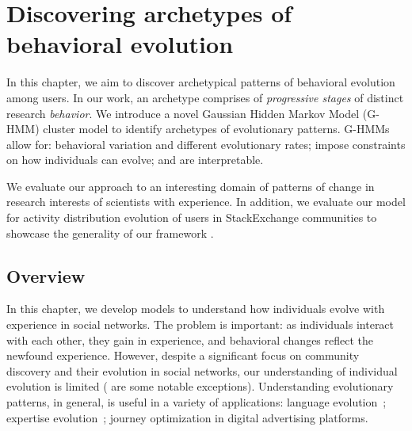 \chapter{Discovering archetypes of behavioral evolution}
\label{chap:evolution}
In this chapter, we aim to discover archetypical patterns of behavioral evolution among users. In our work, an archetype comprises of \emph{progressive stages} of distinct research \emph{behavior}. We introduce a novel Gaussian Hidden Markov Model (G-HMM) cluster model to identify archetypes of evolutionary patterns. G-HMMs allow for: behavioral variation and different evolutionary rates; impose constraints on how individuals can evolve; and are interpretable.

We evaluate our approach to an interesting domain of patterns of change in research interests of scientists with experience. In addition, we evaluate our model for activity distribution evolution of users in StackExchange communities to showcase the generality of our framework \cite{evolution}.


\section{Overview}
\label{sec:Introduction}
In this chapter, we develop models to understand how individuals evolve with experience in social networks. The problem is important: as individuals interact with each other, they gain in experience, and behavioral changes reflect the newfound experience. However, despite a significant focus on community discovery and their evolution in social networks, our understanding of individual evolution is limited (\citet{Yang:2011, McAuley:2013} are some notable exceptions). Understanding evolutionary patterns, in general, is useful in a variety of applications: language evolution~\citep{Danescu}; expertise evolution~\citep{McAuley:2013}; journey optimization in digital advertising platforms.


